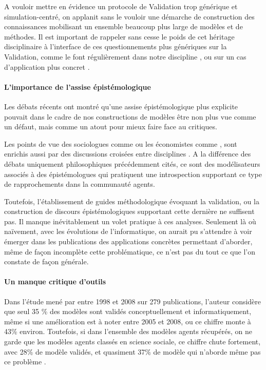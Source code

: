 A vouloir mettre en évidence un protocole de Validation trop générique et simulation-centré, on applanit sans le vouloir une démarche de construction des connaissances mobilisant un ensemble beaucoup plus large de modèles et de méthodes. Il est important de rappeler sans cesse le poids de cet héritage disciplinaire à l'interface de ces questionnements plus génériques sur la Validation, comme le font régulièrement dans notre discipline \textcites{Besse2000, Sanders2000, Mathian2014}, ou sur un cas d'application plus concret \textcites{Cottineau2014a, Cottineau2014b}.

\paragraph{L'importance de l'assise épistémologique}

Les débats récents ont montré qu'une assise épistémologique plus explicite pouvait dans le cadre de nos constructions de modèles être non plus vue comme un défaut, mais comme un atout pour mieux faire face au critiques. 

Les points de vue des sociologues comme \autocites{Hedstrom2010, Elsenbroich2012, Squazzoni2010, Manzo2007, Gilbert2009, Conte2001} ou les économistes comme \autocite{Epstein1996, Phan2010}, sont enrichis aussi par des discussions croisées entre disciplines \autocites{Gilbert1995a,Amblard2006, Phan2010a, Livet2014, Varenne2013,Conte2012}. A la différence des débats uniquement philosophiques précédemment cités, ce sont des modélisateurs associés à des épistémologues qui pratiquent une introspection supportant ce type de rapprochements dans la communauté agents.

Toutefois, l'établissement de guides méthodologique évoquant la validation, ou la construction de discours épistémologiques supportant cette dernière ne suffisent pas. Il manque inévitablement un volet pratique à ces analyses. Seulement là où naïvement, avec les évolutions de l'informatique, on aurait pu s'attendre à voir émerger dans les publications des applications concrètes permettant d'aborder, même de façon incomplète cette problématique, ce n'est pas du tout ce que l'on constate de façon générale.

\paragraph{Un manque critique d'outils}

Dans l'étude mené par \textcite{Heath2009} entre 1998 et 2008 sur 279 publications, l'auteur considère que seul 35 \% des modèles sont validés conceptuellement et informatiquement, même si une amélioration est à noter entre 2005 et 2008, ou ce chiffre monte à 43\% environ. Toutefois, si dans l'ensemble des modèles agents récupérés, on ne garde que les modèles agents classés en science sociale, ce chiffre chute fortement, avec 28\% de modèle validés, et quasiment 37\% de modèle qui n'aborde même pas ce problème .

